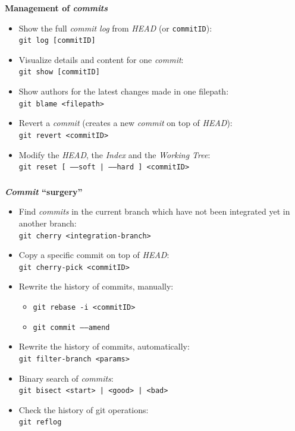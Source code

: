 \begin{frame}[fragile]
  \frametitle{\insertsubsection}

  \textbf{Management of \textit{commits}} \\
  \begin{itemize}
  \item Show the full \textit{commit log} from
    \textit{HEAD} (or \texttt{commitID}):\\
    \texttt{git log [commitID]} \vspacing
  \item Visualize details and content for one \textit{commit}:\\
    \texttt{git show [commitID]} \vspacing
  \item Show authors for the latest changes made in one filepath:\\
    \texttt{git blame <filepath>}
    \vspacing
  \item Revert a \textit{commit} (creates a new \textit{commit} on top
    of \textit{HEAD}):\\
    \texttt{git revert <commitID>} \vspacing
  \item Modify the \textit{HEAD}, the \textit{Index}
    and the \textit{Working Tree}:\\
    \texttt{git reset [ \---\---soft | \---\---hard ] <commitID>}
    \vspacing
  \end{itemize}
\end{frame}

\begin{frame}[fragile]
  \frametitle{\insertsubsection}

  \textbf{\textit{Commit} ``surgery''} \\
  \begin{itemize}
  \item Find \textit{commits} in the current branch which have not
    been integrated yet in another branch:\\
    \texttt{git cherry <integration-branch>}
    \vspacing
  \item Copy a specific commit on top of \textit{HEAD}:\\
    \texttt{git cherry-pick <commitID>}
    \vspacing
  \item Rewrite the history of commits, manually:
    \begin{itemize}
      \item \texttt{git rebase -i <commitID>}
      \item \texttt{git commit \---\---amend}
    \end{itemize}
  \item Rewrite the history of commits, automatically:\\
    \texttt{git filter-branch <params>}
    \vspacing
  \item Binary search of \textit{commits}:\\
    \texttt{git bisect <start> | <good> | <bad>}
    \vspacing
  \item Check the history of git operations:\\
    \texttt{git reflog} \vspacing
  \end{itemize}
\end{frame}

